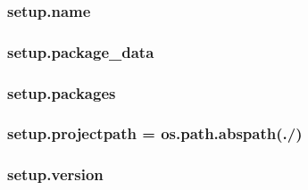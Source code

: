 \subsubsection[{\texorpdfstring{name}{name}}]{\setlength{\rightskip}{0pt plus 5cm}setup.\+name}\hypertarget{namespacesetup_ab3a7a0638d76a01367c5bc3cc699447f}{}\label{namespacesetup_ab3a7a0638d76a01367c5bc3cc699447f}
\subsubsection[{\texorpdfstring{package\+\_\+data}{package_data}}]{\setlength{\rightskip}{0pt plus 5cm}setup.\+package\+\_\+data}\hypertarget{namespacesetup_a0a5ccc22976d20d42c6bb6c7651ce0be}{}\label{namespacesetup_a0a5ccc22976d20d42c6bb6c7651ce0be}
\subsubsection[{\texorpdfstring{packages}{packages}}]{\setlength{\rightskip}{0pt plus 5cm}setup.\+packages}\hypertarget{namespacesetup_aff2375a361fd5865c77bd9aa093be747}{}\label{namespacesetup_aff2375a361fd5865c77bd9aa093be747}
\subsubsection[{\texorpdfstring{projectpath}{projectpath}}]{\setlength{\rightskip}{0pt plus 5cm}setup.\+projectpath = os.\+path.\+abspath(\textquotesingle{}./\textquotesingle{})}\hypertarget{namespacesetup_a739c3c68eac22e69247fde6ccb6a771a}{}\label{namespacesetup_a739c3c68eac22e69247fde6ccb6a771a}
\subsubsection[{\texorpdfstring{version}{version}}]{\setlength{\rightskip}{0pt plus 5cm}setup.\+version}\hypertarget{namespacesetup_a2aa722b36a933088812b50ea79b97a5c}{}\label{namespacesetup_a2aa722b36a933088812b50ea79b97a5c}
